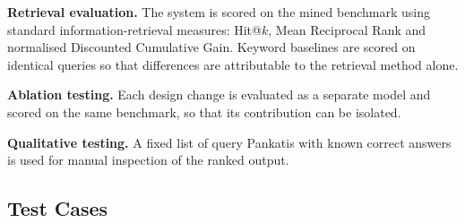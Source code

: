 \documentclass[12pt,a4paper]{article}
\begin{document}
\vspace{0.3cm}

\noindent\textbf{Retrieval evaluation.}
The system is scored on the mined benchmark using standard information-retrieval measures: Hit@$k$, Mean Reciprocal Rank and normalised Discounted Cumulative Gain. Keyword baselines \cite{robertson2009bm25} are scored on identical queries so that differences are attributable to the retrieval method alone.

\vspace{0.3cm}

\noindent\textbf{Ablation testing.}
Each design change is evaluated as a separate model and scored on the same benchmark, so that its contribution can be isolated.

\vspace{0.3cm}

\noindent\textbf{Qualitative testing.}
A fixed list of query Pankatis with known correct answers is used for manual inspection of the ranked output.

\subsection{Test Cases}
\end{document}
